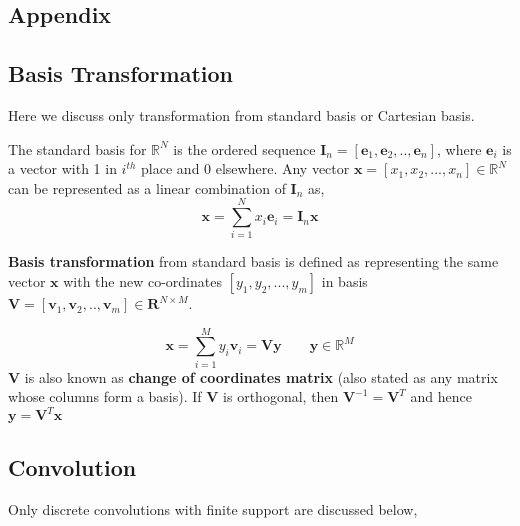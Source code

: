 

\begin{appendices}

\chapter{Appendix}
\section{Basis Transformation}

Here we discuss only transformation from standard \gls{basis} or Cartesian \gls{basis}.
\bigskip

\noindent The standard \gls{basis} for $\mathbb{R}^{N}$ is the ordered sequence $\textbf{I}_{n} = [\textbf{e}_{1}, \textbf{e}_{2}, ..,\textbf{e}_{n}]$, where $\textbf{e}_{i}$ is a vector with 1 in $\textit{i}^{th}$ place and 0 elsewhere. Any vector $\textbf{x} = [x_{1}, x_{2},...,x_{n}] \in \mathbb{R}^{N}$ can be represented as a \gls{linear combination} of $\textbf{I}_{n}$ as,
\[
\textbf{x} = \displaystyle\sum_{i=1}^{N}x_{i}\textbf{e}_{i} = \textbf{I}_{n}\textbf{x}
\]

\noindent \textbf{Basis transformation} from standard \gls{basis} is defined as representing the same vector $\textbf{x}$ with the new co-ordinates $[y_{1}, y_{2},...,y_{m}]$ in \gls{basis} $\textbf{V} = [\textbf{v}_{1}, \textbf{v}_{2}, ..,\textbf{v}_{m}] \in \textbf{R}^{N \times M} $.
\bigskip

\[
\textbf{x} = \displaystyle\sum_{i=1}^{M}y_{i}\textbf{v}_{i} = \textbf{V}\textbf{y} \qquad \textbf{y} \in \mathbb{R}^{M}
\]
$\textbf{V}$ is also known as \textbf{change of coordinates matrix} (also stated as any matrix whose columns form a \gls{basis}). If $\textbf{V}$ is orthogonal, then $\textbf{V}^{-1} = \textbf{V}^{T}$ and hence $\textbf{y} = \textbf{V}^{T}\textbf{x}$

\section{Convolution}
Only discrete convolutions with finite support are discussed below,


\end{appendices}
